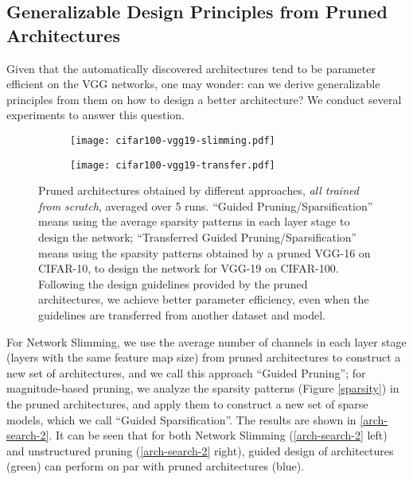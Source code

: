 \subsection{Generalizable Design Principles from Pruned Architectures} 
Given that the automatically discovered architectures tend to be parameter efficient on the VGG networks, one may wonder: can we derive generalizable principles from them on how to design a better architecture? We conduct several experiments to answer this question.


\begin{figure}[!htbp]
\centering
\begin{minipage}{.47\textwidth}
 \begin{subfigure}{\textwidth}
 \centering
 \texttt{[image: cifar100-vgg19-slimming.pdf]}
 \end{subfigure}
\end{minipage}
\begin{minipage}{.47\textwidth}
 \begin{subfigure}{\textwidth}
 \centering
\texttt{[image: cifar100-vgg19-transfer.pdf]}
 \end{subfigure}
\end{minipage}
    \caption{
      Pruned architectures obtained by different approaches, \emph{all trained from scratch}, averaged over 5 runs.
      ``Guided Pruning/Sparsification'' means using the average sparsity patterns in each layer stage  to design the network; ``Transferred Guided Pruning/Sparsification'' means using the sparsity patterns obtained by a pruned VGG-16 on CIFAR-10, to design the network for VGG-19 on CIFAR-100. 
    Following the design guidelines provided by the pruned architectures, we achieve better parameter efficiency, even when the guidelines are transferred from another dataset and model.}
    \label{arch-search-2}
\end{figure}


For Network Slimming, we use the average number of channels in each layer stage (layers with the same feature map size) from pruned architectures to construct a new set of architectures, and we call this approach ``Guided Pruning'';
for magnitude-based pruning, we analyze the sparsity patterns (Figure \ref{sparsity}) in the pruned architectures,
and apply them to construct a new set of sparse models, which we call ``Guided Sparsification''. The results are shown in \autoref{arch-search-2}. It can be seen that for both Network Slimming (\autoref{arch-search-2} left) and unstructured pruning (\autoref{arch-search-2} right), guided design of architectures (green) can perform on par with pruned architectures (blue).

